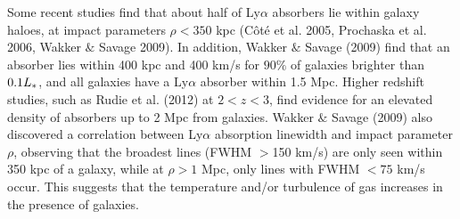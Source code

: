 \documentclass[iop]{emulateapj-rtx4}
\begin{document}



Some recent studies find that about half of Ly$\alpha$ absorbers lie within galaxy haloes, at impact parameters $\rho<350$ kpc (C\^{o}t\'{e} et al. 2005, Prochaska et al. 2006, Wakker $\&$ Savage 2009). In addition, Wakker $\&$ Savage (2009) find that an absorber lies within 400 kpc and 400 km/s for $90\%$ of galaxies brighter than $0.1L_{\**}$, and all galaxies have a Ly$\alpha$ absorber within 1.5 Mpc. Higher redshift studies, such as Rudie et al. (2012) at $2<z<3$, find evidence for an elevated density of absorbers up to 2 Mpc from galaxies. Wakker $\&$ Savage (2009) also discovered a correlation between Ly$\alpha$ absorption linewidth and impact parameter $\rho$, observing that the broadest lines (FWHM $>$150 km/s) are only seen within 350 kpc of a galaxy, while at $\rho>1$ Mpc, only lines with FWHM $<75$ km/s occur. This suggests that the temperature and/or turbulence of gas increases in the presence of galaxies.
\end{document}
